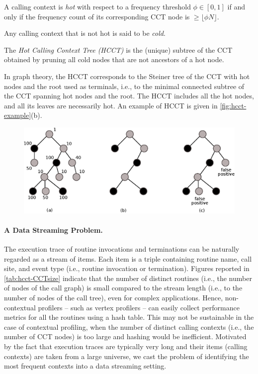 \begin{definition}
A calling context is {\em hot} with respect to a frequency threshold $\phi\in[0,1]$ if and only if the frequency count of its corresponding CCT node is $\geq \lfloor\phi N\rfloor$. 
\end{definition}

\noindent Any calling context that is not hot is said to be {\em cold}. 

\begin{definition}
The {\em Hot Calling Context Tree (HCCT)} is the (unique) subtree of the CCT obtained by pruning all cold nodes that are not ancestors of a hot node.
\end{definition}

\noindent In graph theory, the HCCT corresponds to the Steiner tree of the CCT with hot nodes and the root used as terminals, i.e., to the minimal connected subtree of the CCT spanning hot nodes and the root. The HCCT includes all the hot nodes, and all its leaves are necessarily hot. An example of HCCT is given in \myfigure\ref{fig:hcct-example}(b). 

\ifdefined\noauthorea
\begin{figure}[ht]
\begin{center}
\includegraphics[width=0.95\columnwidth]{figures/hcct-example/hcct-example.eps}
\caption{\protect}
\end{center}
\end{figure}
\fi

\paragraph*{A Data Streaming Problem.} The execution trace of routine invocations and terminations can be naturally regarded as a stream of items. Each item is a triple containing routine name, call site, and event type (i.e., routine invocation or termination). Figures reported in \mytable\ref{tab:hcct-CCTsize} indicate that the number of distinct routines (i.e., the number of nodes of the call graph) is small compared to the stream length (i.e., to the number of nodes of the call tree), even for complex applications. Hence, non-contextual profilers -- such as vertex profilers -- can easily collect performance metrics for all the routines using a hash table. This may not be sustainable in the case of contextual profiling, when the number of distinct calling contexts (i.e., the number of CCT nodes) is too large and hashing would be inefficient. Motivated by the fact that execution traces are typically very long and their items (calling contexts) are taken from a large universe, we cast the problem of identifying the most frequent contexts into a data streaming setting.

